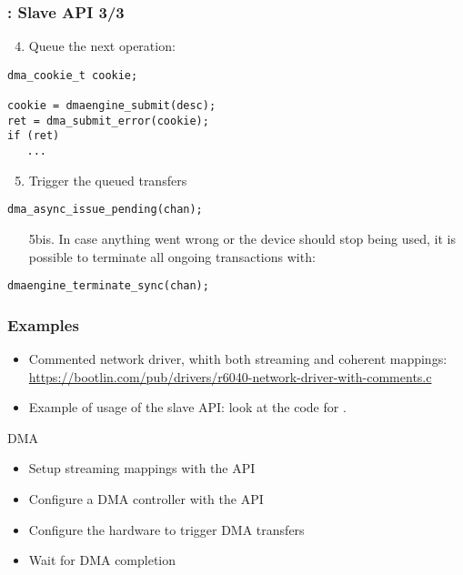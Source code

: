\begin{frame}[fragile]
  \frametitle{: Slave API 3/3}
  \begin{enumerate}
    \setcounter{enumi}{3}
  \item Queue the next operation:
  \end{enumerate}
  \begin{verbatim}
dma_cookie_t cookie;

cookie = dmaengine_submit(desc);
ret = dma_submit_error(cookie);
if (ret)
   ...
\end{verbatim}
  \begin{enumerate}
    \setcounter{enumi}{4}
  \item Trigger the queued transfers
  \end{enumerate}
  \begin{verbatim}
dma_async_issue_pending(chan);
\end{verbatim}
  \begin{enumerate}
  \item[5bis.] In case anything went wrong or the device should stop being
    used, it is possible to terminate all ongoing transactions with:
  \end{enumerate}
  \begin{verbatim}
dmaengine_terminate_sync(chan);
\end{verbatim}
\end{frame}

\begin{frame}
  \frametitle{Examples}
  \begin{itemize}
  \item Commented network driver, whith both streaming and coherent
    mappings:\\
    \small \url{https://bootlin.com/pub/drivers/r6040-network-driver-with-comments.c}
  \item Example of usage of the slave API: look at the code for
    .
  \end{itemize}
\end{frame}

\setuplabframe
{DMA}
{
  \begin{itemize}
  \item Setup streaming mappings with the  API
  \item Configure a DMA controller with the  API
  \item Configure the hardware to trigger DMA transfers
  \item Wait for DMA completion
  \end{itemize}
}
